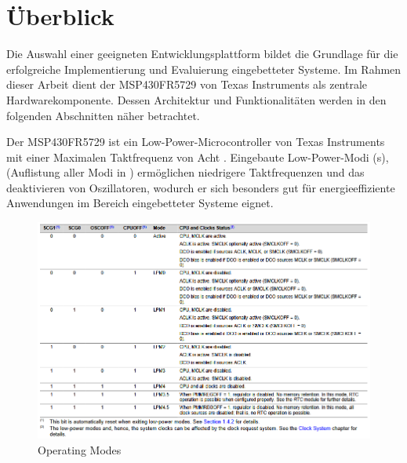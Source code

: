 
\chapter{\"Uberblick}
\label{sec:UeberblickEntwicklungsplattform}

Die Auswahl einer geeigneten Entwicklungsplattform bildet die Grundlage f\"ur die erfolgreiche Implementierung und Evaluierung eingebetteter Systeme. Im Rahmen dieser Arbeit dient der MSP430FR5729 von Texas Instruments als zentrale Hardwarekomponente. Dessen Architektur und Funktionalit\"aten werden in den folgenden Abschnitten n\"aher betrachtet.

Der MSP430FR5729 ist ein Low-Power-Microcontroller   von Texas Instruments mit einer Maximalen Taktfrequenz von Acht . Eingebaute Low-Power-Modi (s), (Auflistung aller Modi in ) erm\"oglichen \ua niedrigere Taktfrequenzen und das deaktivieren von Oszillatoren, wodurch er sich besonders gut f\"ur energieeffiziente Anwendungen im Bereich eingebetteter Systeme eignet. 

\begin{figure}[h!]
	\centering
	\includegraphics[width=1.0\textwidth]{../Bilder/Operating_Modes.png}
	\caption{Operating Modes\\}
	\label{fig:operation_modes}
\end{figure}

